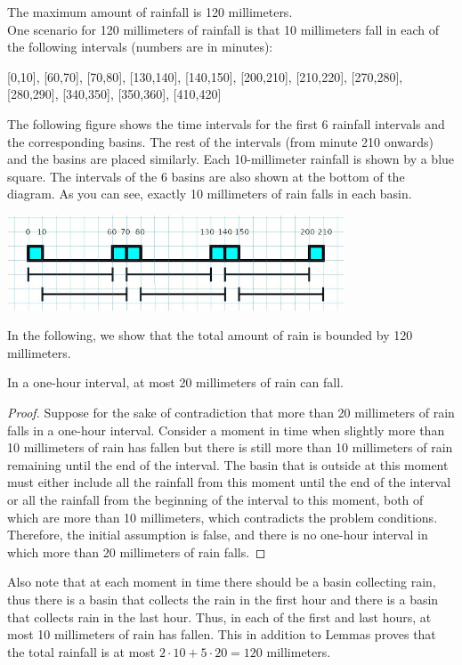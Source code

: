 \begin{solution}
The maximum amount of rainfall is 120 millimeters.\\[0.2cm]

One scenario for 120 millimeters of rainfall is that 10 millimeters fall in each of the following intervals (numbers are in minutes):

[0,10], [60,70], [70,80], [130,140], [140,150], [200,210], [210,220], [270,280], [280,290], [340,350], [350,360], [410,420]

The following figure shows the time intervals for the first 6 rainfall intervals and the corresponding basins. The rest of the intervals (from minute 210 onwards) and the basins are placed similarly. Each 10-millimeter rainfall is shown by a blue square. The intervals of the 6 basins are also shown at the bottom of the diagram. As you can see, exactly 10 millimeters of rain falls in each basin.

\begin{center}
\includegraphics[width=10cm]{79/figs/79_0.jpg}
\end{center}

In the following, we show that the total amount of rain is bounded by 120 millimeters.

\begin{lemma}\label{lm:1}
In a one-hour interval, at most 20 millimeters of rain can fall.
\end{lemma}
\begin{proof}
Suppose for the sake of contradiction that more than 20 millimeters of rain falls in a one-hour interval. Consider a moment in time when slightly more than 10 millimeters of rain has fallen but there is still more than 10 millimeters of rain remaining until the end of the interval. The basin that is outside at this moment must either include all the rainfall from this moment until the end of the interval or all the rainfall from the beginning of the interval to this moment, both of which are more than 10 millimeters, which contradicts the problem conditions. Therefore, the initial assumption is false, and there is no one-hour interval in which more than 20 millimeters of rain falls.
\end{proof}

Also note that at each moment in time there should be a basin collecting rain, thus there is a basin that collects the rain in the first hour and there is a basin that collects rain in the last hour. Thus, in each of the first and last hours, at most 10 millimeters of rain has fallen. This in addition to Lemmas proves that the total rainfall is at most $2\cdot10+5\cdot20=120$ millimeters.
\end{solution}

